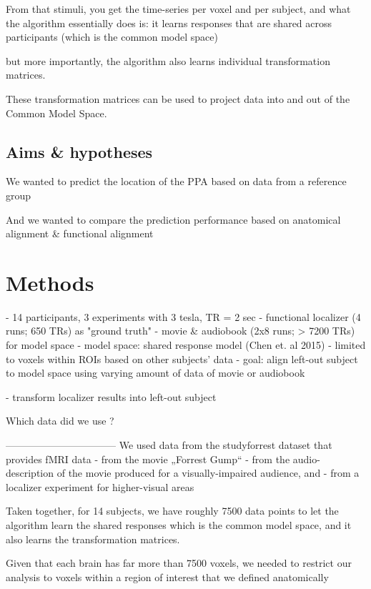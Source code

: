 From that stimuli, you get the time-series per voxel and per subject,
and what the algorithm essentially does is:
it learns responses that are shared across participants
(which is the common model space)

but more importantly, the algorithm also learns individual transformation matrices.

These transformation matrices can be used to project data into
and out of the Common Model Space.


\subsection{Aims \& hypotheses}

We wanted to predict the location of the PPA based on data from a reference group

And we wanted to compare the prediction performance based on
anatomical alignment \& functional alignment



\section{Methods}


- 14 participants, 3 experiments with 3 tesla, TR = 2 sec
- functional localizer (4 runs; 650 TRs) as "ground truth"
- movie \& audiobook (2x8 runs; > 7200 TRs) for model space
- model space: shared response model (Chen et. al 2015)
- limited to voxels within ROIs based on other subjects' data
- goal: align left-out subject to model space using
  varying amount of data of movie or audiobook

- transform localizer results into left-out subject


Which data did we use ?

---------------------------------
We used data from the studyforrest dataset
that provides fMRI data
- from the movie „Forrest Gump“
- from the audio-description of the movie produced for a visually-impaired audience, and
- from a localizer experiment for higher-visual areas

Taken together, for 14 subjects,
we have roughly 7500 data points to let the algorithm learn the shared responses
which is the common model space,
and it also learns the transformation matrices.

Given that each brain has far more than 7500 voxels,
we needed to restrict our analysis to voxels within a region of interest
that we defined anatomically

